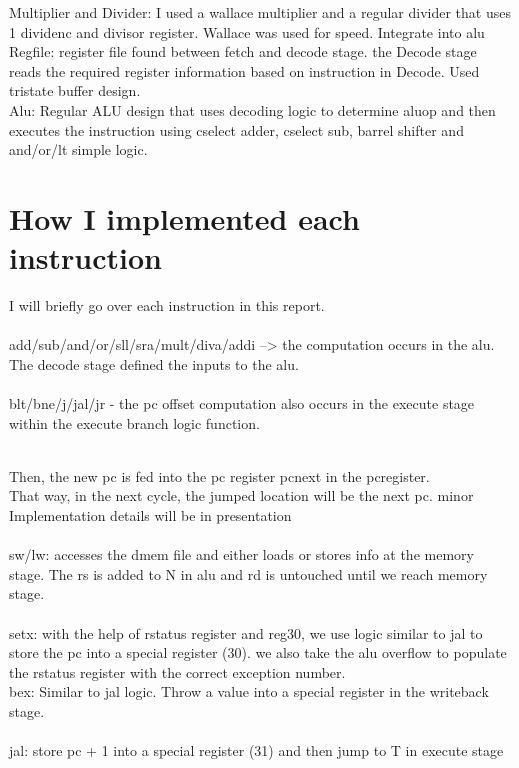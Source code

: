 \documentclass[letterpaper]{article} %
\begin{document}
    Multiplier and Divider: I used a wallace multiplier and a regular divider that uses 1 dividenc and divisor register. Wallace was used for speed. Integrate into alu \\
    Regfile: register file found between fetch and decode stage. the Decode stage reads the required register information based on instruction in Decode. Used tristate buffer design. \\
    Alu: Regular ALU design that uses decoding logic to determine aluop and then executes the instruction using cselect adder, cselect sub, barrel shifter and and/or/lt simple logic. \\
\section{How I implemented each instruction}
    I will briefly go over each instruction in this report.  \\ \\
    add/sub/and/or/sll/sra/mult/diva/addi --> the computation occurs in the alu. The decode stage defined the inputs to the alu. \\ \\
    blt/bne/j/jal/jr - the pc offset computation also occurs in the execute stage within the execute branch logic function. 
    
    \\ Then, the new pc is fed into the pc register pcnext in the pcregister. \\ That way, in the next cycle, the jumped location will be the next pc. minor Implementation details will be in presentation \\ \\
    sw/lw: accesses the dmem file and either loads or stores info at the memory stage. The rs is added to N in alu and rd is untouched until we reach memory stage. \\ \\
    setx: with the help of rstatus register and reg30, we use logic similar to jal to store the pc into a special register (30). we also take the alu overflow to populate the rstatus register with the correct exception number. \\
    bex: Similar to jal logic. Throw a value into a special register in the writeback stage. \\ \\
    jal: store pc + 1 into a special register (31) and then jump to T in execute stage \\ \\
\end{document}
